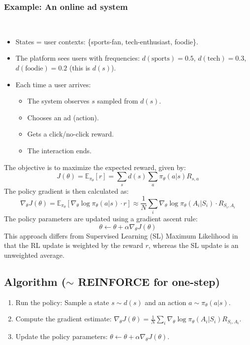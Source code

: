 \documentclass[12pt]{article}
\begin{document}
\subsubsection*{Example: An online ad system} \\

\begin{itemize}
    \item States = user contexts: \{sports-fan, tech-enthusiast, foodie\}.
    \item The platform sees users with frequencies: $d(\text{sports}) = 0.5$, $d(\text{tech}) = 0.3$, $d(\text{foodie}) = 0.2$ (this is $d(s)$).
    \item Each time a user arrives:
    \begin{itemize}
        \item The system observes $s$ sampled from $d(s)$.
        \item Chooses an ad (action).
        \item Gets a click/no-click reward.
        \item The interaction ends.
    \end{itemize}
\end{itemize}



The objective is to maximize the expected reward, given by:
$$
J(\theta) = \mathbb{E}_{\pi_\theta}[r] = \sum_s d(s) \sum_a \pi_\theta(a|s) R_{s,a}
$$
The policy gradient is then calculated as:
$$
\nabla_\theta J(\theta) = \mathbb{E}_{\pi_\theta} [ \nabla_\theta \log \pi_\theta(a|s) \cdot r ] \approx \frac{1}{N} \sum_i \nabla_\theta \log \pi_\theta(A_i|S_i) \cdot R_{S_i,A_i}
$$
The policy parameters are updated using a gradient ascent rule:
$$
\theta \leftarrow \theta + \alpha \nabla_\theta J(\theta)
$$
This approach differs from Supervised Learning (SL) Maximum Likelihood in that the RL update is weighted by the reward $r$, whereas the SL update is an unweighted average.

\subsection{Algorithm ($\sim$ REINFORCE for one-step)}
\begin{enumerate}
    \item Run the policy: Sample a state $s \sim d(s)$ and an action $a \sim \pi_\theta(a|s)$.
    \item Compute the gradient estimate: $\nabla_\theta J(\theta) = \frac{1}{N} \sum_i \nabla_\theta \log \pi_\theta(A_i|S_i) R_{S_i,A_i}$.
    \item Update the policy parameters: $\theta \leftarrow \theta + \alpha \nabla_\theta J(\theta)$.
\end{enumerate}
\end{document}
